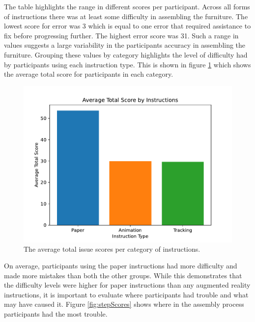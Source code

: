 \documentclass{l4proj}
\begin{document}
The table highlights the range in different scores per participant. Across all forms of instructions there was at least some difficulty in assembling the furniture. The lowest score for error was 3 which is equal to one error that required assistance to fix before progressing further. The highest error score was 31. Such a range in values suggests a large variability in the participants accuracy in assembling the furniture. Grouping these values by category highlights the level of difficulty had by participants using each instruction type. This is shown in figure \ref{fig:avgScores} which shows the average total score for participants in each category. \clearpage

\begin{figure}[hbt!]
    \centering
    \includegraphics[width=0.75\linewidth]{dissertation//images/avgScores.pdf}
    \caption{The average total issue scores per category of instructions.}
    \label{fig:avgScores}
\end{figure}

On average, participants using the paper instructions had more difficulty and made more mistakes than both the other groups. While this demonstrates that the difficulty levels were higher for paper instructions than any augmented reality instructions, it is important to evaluate where participants had trouble and what may have caused it. Figure \ref{fig:stepScores} shows where in the assembly process participants had the most trouble.

\end{document}
